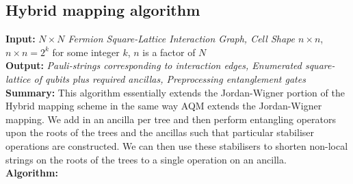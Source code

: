 \documentclass[pdftex,pra,aps,twocolumn,twoside]{revtex4-2}
\theoremstyle{plain}
\theoremstyle{note}
\newcommand\+{{\footnotesize \raisebox{0.3ex}{+}}}
\begin{document}
\subsection{Hybrid\+ mapping algorithm}
\label{section:auxHybridmapping}
\noindent
\textbf{Input:} \textit{$N\times N$ Fermion Square-Lattice Interaction Graph, Cell Shape $n \times n$}, $n \times n = 2^k$ for some integer $k$, $n$ is a factor of $N$\\
\textbf{Output:} \textit{Pauli-strings corresponding to interaction edges, Enumerated square-lattice of qubits plus required ancillas, Preprocessing entanglement gates}\\
\textbf{Summary:} This algorithm essentially extends the Jordan-Wigner portion of the Hybrid mapping scheme in the same way AQM extends the Jordan-Wigner mapping. We add in an ancilla per tree and then perform entangling operators upon the roots of the trees and the ancillas such that particular stabiliser operations are constructed. We can then use these stabilisers to shorten non-local strings on the roots of the trees to a single operation on an ancilla.\\
\textbf{Algorithm:}
\end{document}
